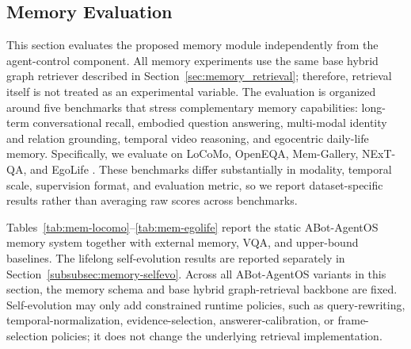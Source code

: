 \subsection{Memory Evaluation}
\label{subsec:exp-memory}

This section evaluates the proposed memory module independently from the agent-control component.
All memory experiments use the same base hybrid graph retriever described in Section~\ref{sec:memory_retrieval}; therefore, retrieval itself is not treated as an experimental variable.
The evaluation is organized around five benchmarks that stress complementary memory capabilities: long-term conversational recall, embodied question answering, multi-modal identity and relation grounding, temporal video reasoning, and egocentric daily-life memory.
Specifically, we evaluate on LoCoMo, OpenEQA, Mem-Gallery, NExT-QA, and EgoLife \cite{locomo,openeqa,memgallery,nextqa,egolife}.
These benchmarks differ substantially in modality, temporal scale, supervision format, and evaluation metric, so we report dataset-specific results rather than averaging raw scores across benchmarks.

Tables~\ref{tab:mem-locomo}--\ref{tab:mem-egolife} report the static ABot-AgentOS memory system together with external memory, VQA, and upper-bound baselines.
The lifelong self-evolution results are reported separately in Section~\ref{subsubsec:memory-selfevo}.
Across all ABot-AgentOS variants in this section, the memory schema and base hybrid graph-retrieval backbone are fixed.
Self-evolution may only add constrained runtime policies, such as query-rewriting, temporal-normalization, evidence-selection, answerer-calibration, or frame-selection policies; it does not change the underlying retrieval implementation.


